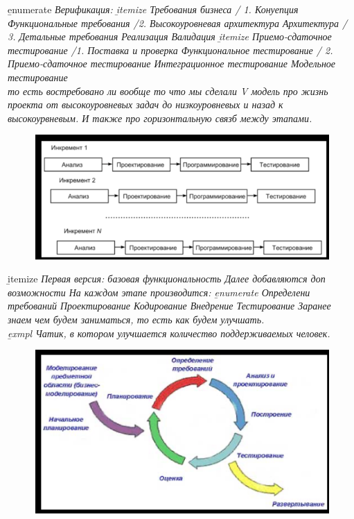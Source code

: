 \documentclass[12pt; a4paper]{book}
\theoremstyle{plain} %
\theoremstyle{defenition}
\theoremstyle{remark}
\begin{document}
\b{enumerate}
\it Верификация:
\b{itemize}
\it Требования бизнеса / 1. Конуепция
\it Функциональные требования /2. Высокоуровневая архитектура
\it Архитектура / 3. Детальные требования
\it Реализация
\it Валидация
\b{itemize}
\it Приемо-сдаточное тестирование /1. Поставка и проверка
\it Функциональное тестирование / 2. Приемо-сдаточное тестирование
\it Интеграционное тестирование
\it Модельное тестирование\\
{\normalsize то есть востребовано ли вообще то что мы сделали}
V модель про жизнь проекта от высокоуровневых задач до низкоуровневых и назад к высокоурвневым. И также про горизонтальную связб между этапами.


\newpage
{}
\begin{figure}[!htbp]
\includegraphics[angle=0, width=\textwidth]{IMG/13} \\
\end{figure}

\b{itemize}
\it Первая версия: базовая функциональность
\it Далее добавляются доп возможности
\it На каждом этапе производится:
    \b{enumerate}
    \it Определени требований
    \it Проектирование
    \it Кодирование   
    \it Внедрение
    \it Тестирование
Заранее знаем чем будем заниматься, то есть как будем улучшать.\\
\b{exmpl}
    Чатик, в котором улучшается количество поддерживаемых человек.

\newpage
{}
\begin{figure}[!htbp]
\includegraphics[angle=0, width=\textwidth]{IMG/14} \\
\end{figure}
\end{document}
